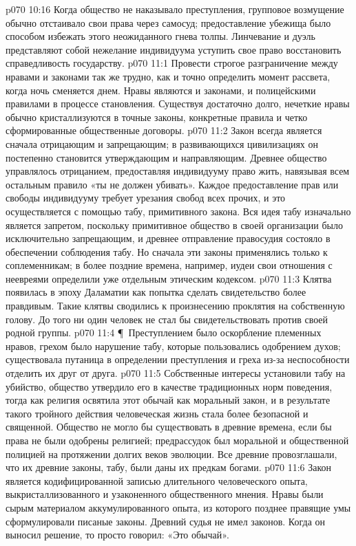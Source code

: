 \vs p070 10:16 Когда общество не наказывало преступления, групповое возмущение обычно отстаивало свои права через самосуд; предоставление убежища было способом избежать этого неожиданного гнева толпы. Линчевание и дуэль представляют собой нежелание индивидуума уступить свое право восстановить справедливость государству.
\vs p070 11:1 Провести строгое разграничение между нравами и законами так же трудно, как и точно определить момент рассвета, когда ночь сменяется днем. Нравы являются и законами, и полицейскими правилами в процессе становления. Существуя достаточно долго, нечеткие нравы обычно кристаллизуются в точные законы, конкретные правила и четко сформированные общественные договоры.
\vs p070 11:2 Закон всегда является сначала отрицающим и запрещающим; в развивающихся цивилизациях он постепенно становится утверждающим и направляющим. Древнее общество управлялось отрицанием, предоставляя индивидууму право жить, навязывая всем остальным правило «ты не должен убивать». Каждое предоставление прав или свободы индивидууму требует урезания свобод всех прочих, и это осуществляется с помощью табу, примитивного закона. Вся идея табу изначально является запретом, поскольку примитивное общество в своей организации было исключительно запрещающим, и древнее отправление правосудия состояло в обеспечении соблюдения табу. Но сначала эти законы применялись только к соплеменникам; в более поздние времена, например, иудеи свои отношения с неевреями определили уже отдельным этическим кодексом.
\vs p070 11:3 Клятва появилась в эпоху Даламатии как попытка сделать свидетельство более правдивым. Такие клятвы сводились к произнесению проклятия на собственную голову. До того ни один человек не стал бы свидетельствовать против своей родной группы.
\vs p070 11:4 \P\ Преступлением было оскорбление племенных нравов, грехом было нарушение табу, которые пользовались одобрением духов; существовала путаница в определении преступления и греха из\hyp{}за неспособности отделить их друг от друга.
\vs p070 11:5 Собственные интересы установили табу на убийство, общество утвердило его в качестве традиционных норм поведения, тогда как религия освятила этот обычай как моральный закон, и в результате такого тройного действия человеческая жизнь стала более безопасной и священной. Общество не могло бы существовать в древние времена, если бы права не были одобрены религией; предрассудок был моральной и общественной полицией на протяжении долгих веков эволюции. Все древние провозглашали, что их древние законы, табу, были даны их предкам богами.
\vs p070 11:6 Закон является кодифицированной записью длительного человеческого опыта, выкристаллизованного и узаконенного общественного мнения. Нравы были сырым материалом аккумулированного опыта, из которого позднее правящие умы сформулировали писаные законы. Древний судья не имел законов. Когда он выносил решение, то просто говорил: «Это обычай».

